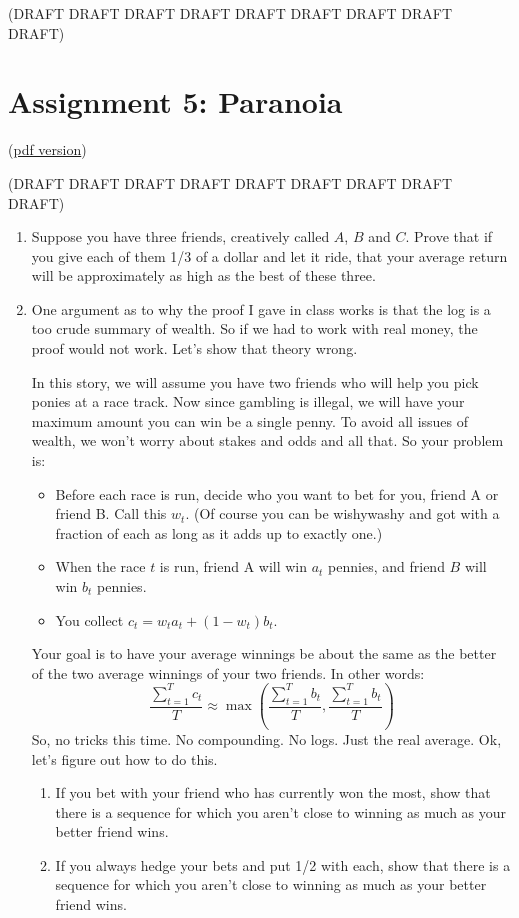 \documentclass[11pt]{article}
\begin{document}
(DRAFT DRAFT DRAFT DRAFT DRAFT DRAFT DRAFT DRAFT DRAFT)

\section*{Assignment 5: Paranoia}

(\href{assignment5.pdf}{pdf version}) 

(DRAFT DRAFT DRAFT DRAFT DRAFT DRAFT DRAFT DRAFT DRAFT)


\begin{enumerate}
\item Suppose you have three friends, creatively called $A$, $B$ and
$C$.  Prove that if you give each of them 1/3 of a dollar and let it
ride, that your average return will be approximately as high as the
best of these three.

\item One argument as to why the proof I gave in class works is that
the log is a too crude summary of wealth.  So if we had to work with
real money, the proof would not work.  Let's show that theory wrong.

In this story, we will assume you have two friends who will help you
pick ponies at a race track.  Now since gambling is illegal, we will
have your maximum amount you can win be a single penny.  To avoid all
issues of wealth, we won't worry about stakes and odds and all that.
So your problem is:

\begin{itemize}
\item Before each race is run, decide who you want to bet for you,
 friend A or friend B.  Call this $w_t$.  (Of course you can be
 wishywashy and got with a fraction of each as long as it adds up to
 exactly one.)
\item When the race $t$ is run, friend A will win $a_t$ pennies, and
friend $B$ will win $b_t$ pennies.
\item You collect $c_t = w_t a_t + (1-w_t) b_t$.
\end{itemize}

Your goal is to have your average winnings be about the same as the
better of the two average winnings of your two friends.  In other words:
\begin{displaymath}
\frac{\sum_{t=1}^T c_t}{T} \approx \max(\frac{\sum_{t=1}^T b_t}{T},\frac{\sum_{t=1}^T b_t}{T})
\end{displaymath}
So, no tricks this time.  No compounding.  No logs.  Just the real
average.  Ok, let's figure out how to do this.
\begin{enumerate}
\item If you bet with your friend who has currently won the most, show
that there is a sequence for which you aren't close to winning as much
as your better friend wins.
\item If you always hedge your bets and put 1/2 with each, show that
there is a sequence for which you aren't close to winning as much
as your better friend wins.
\end{enumerate}


\end{enumerate}
\end{document}
